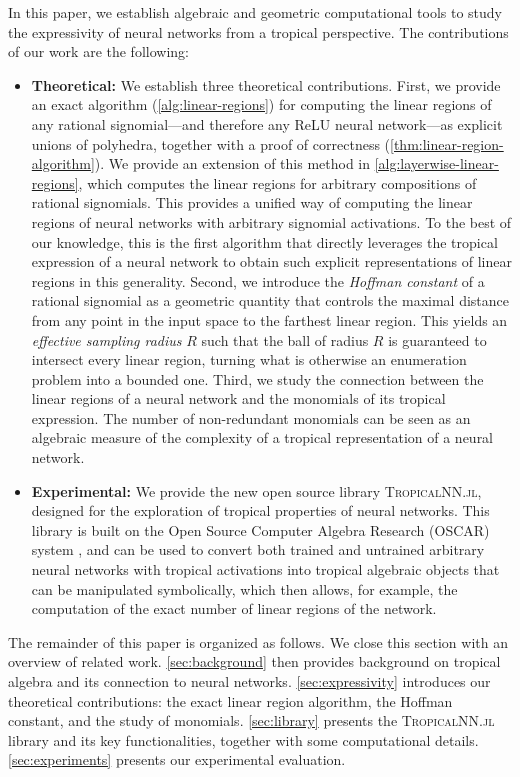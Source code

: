 \documentclass[10pt]{article}
\theoremstyle{definition}
\theoremstyle{remark}
\begin{document}
In this paper, we establish algebraic and geometric computational tools to study the expressivity of neural networks from a tropical perspective. The contributions of our work are the following:
\begin{itemize}
    \item \textbf{Theoretical:} We establish three theoretical contributions. First, we provide an exact algorithm (\cref{alg:linear-regions}) for computing the linear regions of any rational signomial---and therefore any ReLU neural network---as explicit unions of polyhedra, together with a proof of correctness (\cref{thm:linear-region-algorithm}). We provide an extension of this method in \cref{alg:layerwise-linear-regions}, which computes the linear regions for arbitrary compositions of rational signomials. This provides a unified way of computing the linear regions of neural networks with arbitrary signomial activations.
    To the best of our knowledge, this is the first algorithm that directly leverages the tropical expression of a neural network to obtain such explicit representations of linear regions in this generality. Second, we introduce the \emph{Hoffman constant} of a rational signomial as a geometric quantity that controls the maximal distance from any point in the input space to the farthest linear region. This yields an \emph{effective sampling radius} $R$ such that the ball of radius $R$ is guaranteed to intersect every linear region, turning what is otherwise an enumeration problem into a bounded one. Third, we study the connection between the linear regions of a neural network and the monomials of its tropical expression. The number of non-redundant monomials can be seen as an algebraic measure of the complexity of a tropical representation of a neural network.

    \item \textbf{Experimental:} We provide the new open source library \textsc{TropicalNN.jl}, designed for the exploration of tropical properties of neural networks. This library is built on the Open Source Computer Algebra Research (OSCAR) system \citep{OSCAR}, and can be used to convert both trained and untrained arbitrary neural networks with tropical activations into tropical algebraic objects that can be manipulated symbolically, which then allows, for example, the computation of the exact number of linear regions of the network.
\end{itemize}

The remainder of this paper is organized as follows. We close this section with an overview of related work. \cref{sec:background} then provides background on tropical algebra and its connection to neural networks.
\cref{sec:expressivity} introduces our theoretical contributions: the exact linear region algorithm, the Hoffman constant, and the study of monomials.
\cref{sec:library} presents the \textsc{TropicalNN.jl} library and its key functionalities, together with some computational details.
\cref{sec:experiments} presents our experimental evaluation.
\end{document}
